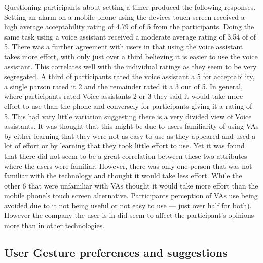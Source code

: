 \documentclass{l4proj}
\begin{document}
Questioning participants about setting a timer produced the following responses. Setting an alarm on a mobile phone using the devices touch screen received a high average acceptability rating of 4.79 of of 5 from the participants. Doing the same task using a voice assistant received a moderate average rating of 3.54 of of 5. There was a further agreement with users in that using the voice assistant takes more effort, with only just over a third believing it is easier to use the voice assistant. This correlates well with the individual ratings as they seem to be very segregated. A third of participants rated the voice assistant a 5 for acceptability, a single parson rated it 2 and the remainder rated it a 3 out of 5. In general, where participants rated Voice assistants 2 or 3 they said it would take more effort to use than the phone and conversely for participants giving it a rating of 5. This had vary little variation suggesting there is a very divided view of Voice assistants. It was thought that this might be due to users familiarity of using VAs by either learning that they were not as easy to use as they appeared and used a lot of effort or by learning that they took little effort to use. Yet it was found that there did not seem to be a great correlation between these two attributes where the users were familiar. However, there was only one person that was not familiar with the technology and thought it would take less effort. While the other 6 that were unfamiliar with VAs thought it would take more effort than the mobile phone's touch screen alternative. Participants perception of VAs use being avoided due to it not being useful or not easy to use --- just over half for both). However the company the user is in did seem to affect the participant's opinions more than in other technologies.

\subsection{User Gesture preferences and suggestions}
\end{document}

